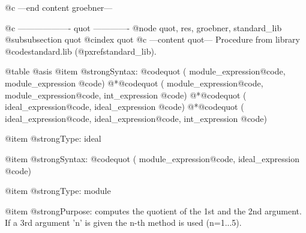 @c ---end content groebner---

@c ------------------- quot -------------
@node quot, res, groebner, standard_lib
@subsubsection quot
@cindex quot
@c ---content quot---
Procedure from library @code{standard.lib} (@pxref{standard_lib}).

@table @asis
@item @strong{Syntax:}
@code{quot (} module_expression@code{,} module_expression @code{)}
@*@code{quot (} module_expression@code{,} module_expression@code{,}
int_expression @code{)}
@*@code{quot (} ideal_expression@code{,} ideal_expression @code{)}
@*@code{quot (} ideal_expression@code{,} ideal_expression@code{,}
int_expression @code{)}

@item @strong{Type:}
ideal

@item @strong{Syntax:}
@code{quot (} module_expression@code{,} ideal_expression @code{)}

@item @strong{Type:}
module

@item @strong{Purpose:}
computes the quotient of the 1st and the 2nd argument.
If a 3rd argument 'n' is given the n-th method is used
(n=1...5).

